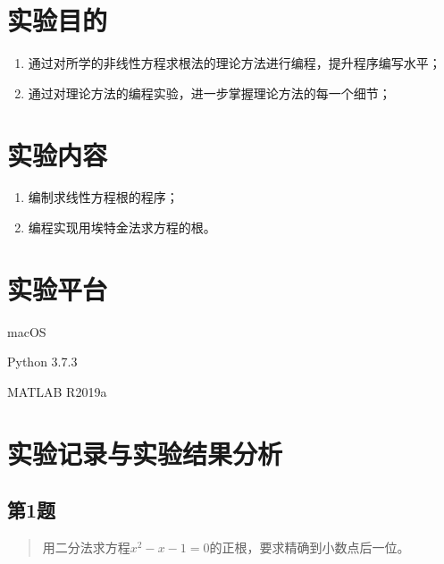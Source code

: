 






\newcommand{\ThisProjectTitle}{非线性方程求根}
\newcommand{\ThisDate}{2017-12-25}
\newcommand{\ThisNo}{No.6}






\section{实验目的}
\begin{enumerate}[leftmargin=1.4cm, itemsep=-0.5mm]
    \item 通过对所学的非线性方程求根法的理论方法进行编程，提升程序编写水平；
    \item 通过对理论方法的编程实验，进一步掌握理论方法的每一个细节；
\end{enumerate}

\section{实验内容}
\begin{enumerate}[leftmargin=1.4cm, itemsep=-0.5mm]
    \item 编制求线性方程根的程序；
    \item 编程实现用埃特金法求方程的根。
\end{enumerate}

\section{实验平台}

macOS

Python 3.7.3

MATLAB R2019a

\section{实验记录与实验结果分析}

\subsection{第1题}
\begin{quote}
    {\kaishu
        用二分法求方程$x^2-x-1=0$的正根，要求精确到小数点后一位。\cite{RN731}
    }
\end{quote}

